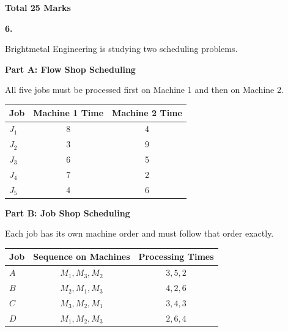 \documentclass[11pt,a4paper]{article}
\newcommand{\questiontotal}[1]{\begin{flushright}\textbf{Total #1 Marks}\end{flushright}}
\begin{document}
\questiontotal{25}

\newpage

\textbf{6.}

Brightmetal Engineering is studying two scheduling problems.

\textbf{Part A: Flow Shop Scheduling}

All five jobs must be processed first on Machine 1 and then on Machine 2.

\begin{center}
\begin{tabular}{lcc}
\toprule
Job & Machine 1 Time & Machine 2 Time \\
\midrule
$J_1$ & 8 & 4 \\
$J_2$ & 3 & 9 \\
$J_3$ & 6 & 5 \\
$J_4$ & 7 & 2 \\
$J_5$ & 4 & 6 \\
\bottomrule
\end{tabular}
\end{center}

\textbf{Part B: Job Shop Scheduling}

Each job has its own machine order and must follow that order exactly.

\begin{center}
\begin{tabular}{lcc}
\toprule
Job & Sequence on Machines & Processing Times \\
\midrule
$A$ & $M_1, M_3, M_2$ & $3, 5, 2$ \\
$B$ & $M_2, M_1, M_3$ & $4, 2, 6$ \\
$C$ & $M_3, M_2, M_1$ & $3, 4, 3$ \\
$D$ & $M_1, M_2, M_3$ & $2, 6, 4$ \\
\bottomrule
\end{tabular}
\end{center}
\end{document}
